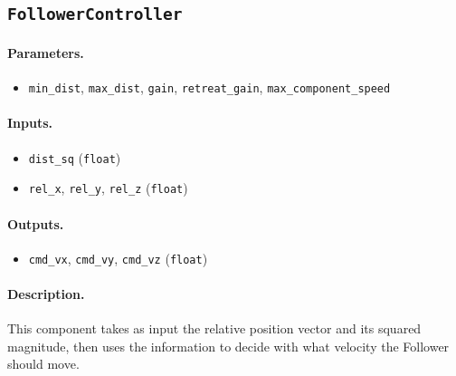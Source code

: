 \documentclass{article}
\begin{document}
\subsection{\texttt{FollowerController}}

\paragraph{Parameters.}
\begin{itemize}
    \item \verb|min_dist|, \verb|max_dist|, \verb|gain|,
          \verb|retreat_gain|, \verb|max_component_speed|
\end{itemize}

\paragraph{Inputs.}
\begin{itemize}
    \item \verb|dist_sq| (\verb|float|)
    \item \verb|rel_x|, \verb|rel_y|, \verb|rel_z| (\verb|float|)
\end{itemize}

\paragraph{Outputs.}
\begin{itemize}
    \item \verb|cmd_vx|, \verb|cmd_vy|, \verb|cmd_vz| (\verb|float|)
\end{itemize}

\paragraph{Description.} This component takes as input the relative position vector and its squared magnitude, then uses the information to decide with what velocity the Follower should move. 
\end{document}

